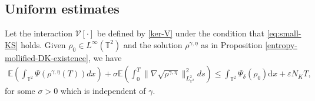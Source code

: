 \subsection{Uniform estimates}

\begin{prop}\label{entropy estimate}
 Let the interaction $\mathcal{V}[\cdot]$ be defined by \eqref{ker-V} under the condition that \eqref{eq:small-KS} holds. Given $\rho_0\in L^\infty(\mathbb{T}^2)$ and the solution $\rho^{\gamma, \eta}$ as in Proposition \ref{entropy-mollified-DK-existence}, we have
\begin{align}\label{entropy0}
\mathbb{E}\left(\int_{\mathbb{T}^2}\Psi(\rho^{\gamma, \eta}(T))dx\right) + \sigma\mathbb{E}\left(\int_0^T\|\nabla\sqrt{\rho^{\gamma, \eta}}\|_{L^2_{\mathbb{T}^2}}^2ds\right)\leq \int_{\mathbb{T}^2}\Psi_{\delta}(\rho_0)\mathrm{d}x + \varepsilon N_KT, 
\end{align}
for some $\sigma > 0$ which is independent of $\gamma$.
\end{prop}
